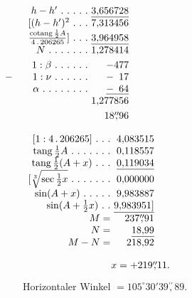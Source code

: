 \begin{minipage}[t]{.31\linewidth}\centering
$\begin{array}{r@{\ }r}
h-h'\ .\ .\ .\ .\ .&\underline{3{,}656728}\\
{[}(h-h')^2\ .\ .\ .&7{,}313456\\
\frac{\operatorname{cotang}\frac12A}{4\,.\,206265}]\ .\ .\ .&\underline{3{,}964958}\\
N\ .\ .\ .\ .\ .\ .\ .&1{,}278414\\[3pt]
1:\beta\ .\ .\ .\ .\ .\ .&-477\\
\makebox[0pt][r]{$-$\qquad}1:\nu\ .\ .\ .\ .\ .\ .&-\phantom{1}17\\
\alpha\ .\ .\ .\ .\ .\ .\ .\ .&\underline{-\phantom{1}64}\\
&1{,}277856\\[3pt]
&18\overset{\prime\prime}{,}96
\end{array}$
\end{minipage}\hfill
\begin{minipage}[t]{.34\linewidth}\centering
$\begin{array}{r@{\ }r}
{[}1:4\,.\,206265]\ .\ .\ .&4{,}083515\\
\operatorname{tang}\tfrac12A\ .\ .\ .\ .\ .\ .\ .&0{,}118557\\
\operatorname{tang}\tfrac12(A+x)\ .\ .\ .&\underline{0{,}119034}\\
{[}\sqrt[3]{\sec\tfrac12x}\ .\ .\ .\ .\ .\ .\ .&0{,}000000\\
\sin(A+x)\ .\ .\ .\ .\ .&9{,}983887\\
\sin(A+\tfrac12x)\ .\ .&\underline{9{,}983951]}\\
M=&237\overset{\prime\prime}{,}91\\
N=&\underline{18{,}99}\\
M-N=&218{,}92
\end{array}$
\end{minipage}
\[
x=+219\overset{\prime\prime}{,}11.\hspace*{.36\linewidth}
\]
\noindent Horizontaler Winkel $=105^\circ30'39\overset{\prime\prime}{,}89$.

